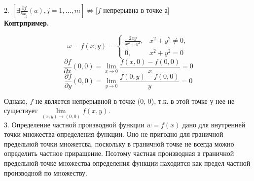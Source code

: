 \documentclass[a4paper,12pt]{article} %
\begin{document}
	2. $\left[\exists \frac{\partial f}{\partial x_j}(a), j = 1, \ldots, m\right] \not\Rightarrow [f$ непрерывна в точке а$]$ \\
	
\textbf{Контрпример.}
	
\begin{equation*}
	\omega = f(x, y) = 
	\begin{cases}
		\frac{2xy}{x^2 + y^2}, & x^2 + y^2 \not=0,\\
		0, & x^2 + y^2 = 0
	\end{cases}
\end{equation*}
\[\frac{\partial f}{\partial x}(0,0) = \lim\limits_{x\to 0} \frac{f(x, 0) - f(0, 0)}{x} = 0\]
\[\frac{\partial f}{\partial y}(0,0) = \lim\limits_{y\to 0} \frac{f(0, y) - f(0, 0)}{y} = 0\]

Однако, $f$ не является непрерывной в точке (0, 0), т.к. в этой точке у нее не существует $\lim\limits_{(x, y) \to (0, 0)} f(x, y)$.\\
	
3. Определение частной производной функции $w = f(x)$ дано для внутренней точки множества определения функции. Оно не пригодно для граничной предельной точки множетсва, поскольку в граничной точке не всегда можно определить частное приращение. Поэтому частная производная в граничной предельной точке множества определения функции находится как предел частной производной по множеству.
	
\end{document}
